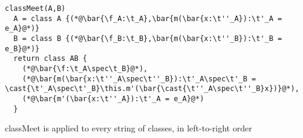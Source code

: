 \documentclass{report}
\newcommand{\spec}{\vartriangleright}
\begin{document}
\begin{lstlisting}
classMeet(A,B)
  A = class A {(*@\bar{\f_A:\t_A},\bar{m(\bar{x:\t''_A}):\t'_A = e_A}@*)}
  B = class B {(*@\bar{\f_B:\t_B},\bar{m(\bar{x:\t''_B}):\t'_B = e_B}@*)}
  return class AB {
    (*@\bar{\f:\t_A\spec\t_B}@*),
    (*@\bar{m(\bar{x:\t''_A\spec\t''_B}):\t'_A\spec\t'_B = \cast{\t'_A\spec\t'_B}\this.m'(\bar{\cast{\t''_A\spec\t''_B}x})}@*),
    (*@\bar{m'(\bar{x:\t''_A}):\t'_A = e_A}@*)
  }
\end{lstlisting}

classMeet is applied to every string of classes, in left-to-right order
\end{document}
